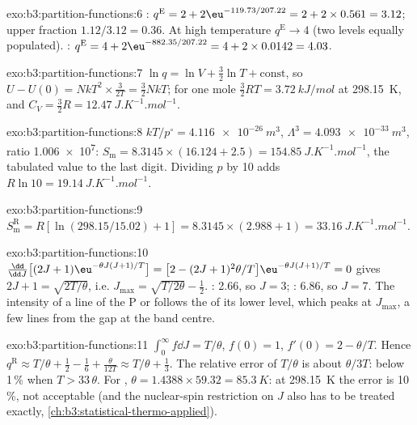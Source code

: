 \begin{solution}{exo:b3:partition-functions:6}
: $q^{\mathrm E} = 2 + 2\eu^{-119.73/207.22} = 2 + 2 \times 0.561 = 3.12$; upper fraction $1.12/3.12
= 0.36$. At high temperature $q^{\mathrm E} \to 4$ (two levels equally populated). :
$q^{\mathrm E} = 4 + 2\eu^{-882.35/207.22} = 4 + 2 \times 0.0142 = 4.03$.
\end{solution}

\begin{solution}{exo:b3:partition-functions:7}
$\ln q = \ln V + \frac32\ln T + \text{const}$, so $U - U(0) = NkT^2 \times \frac{3}{2T} = \frac32NkT$; for one
mole $\frac32RT = \qty{3.72}{kJ/mol}$ at \qty{298.15}{K}, and $C_V = \frac32R = \qty{12.47}{J.K^{-1}.mol^{-1}}$.
\end{solution}

\begin{solution}{exo:b3:partition-functions:8}
$kT/p^\circ = \qty{4.116e-26}{m^3}$, $\Lambda^3 = \qty{4.093e-33}{m^3}$, ratio \num{1.006e7}:
$S_{\mathrm m} = 8.3145 \times (16.124 + 2.5) = \qty{154.85}{J.K^{-1}.mol^{-1}}$, the tabulated value to the
last digit. Dividing $p$ by 10 adds $R\ln10 = \qty{19.14}{J.K^{-1}.mol^{-1}}$.
\end{solution}

\begin{solution}{exo:b3:partition-functions:9}
$S^{\mathrm R}_{\mathrm m} = R[\ln(298.15/15.02) + 1] = 8.3145 \times (2.988 + 1) = \qty{33.16}{J.K^{-1}.mol^{-1}}$.
\end{solution}

\begin{solution}{exo:b3:partition-functions:10}
$\frac{\dd}{\dd J}\bigl[(2J+1)\eu^{-\theta J(J+1)/T}\bigr] = \bigl[2 - (2J+1)^2\theta/T\bigr]\eu^{-\theta J(J+1)/T} = 0$ gives
$2J + 1 = \sqrt{2T/\theta}$, i.e. $J_{\max} = \sqrt{T/2\theta} - \frac12$. : 2.66, so $J = 3$; :
6.86, so $J = 7$. The intensity of a line of the P or  follows the
 of its lower level, which peaks at $J_{\max}$, a few lines from the gap
at the band centre.
\end{solution}

\begin{solution}{exo:b3:partition-functions:11}
$\int_0^\infty f\dd J = T/\theta$, $f(0) = 1$, $f'(0) = 2 - \theta/T$. Hence $q^{\mathrm R} \approx T/\theta + \frac12 -
\frac16 + \frac{\theta}{12T} \approx T/\theta + \frac13$. The relative error of $T/\theta$ is about $\theta/3T$:
below 1\,\% when $T > 33\,\theta$. For , $\theta = 1.4388 \times 59.32 = \qty{85.3}{K}$: at
\qty{298.15}{K} the error is 10\,\%, not acceptable (and the nuclear-spin
restriction on $J$ also has to be treated exactly, \cref{ch:b3:statistical-thermo-applied}).
\end{solution}

